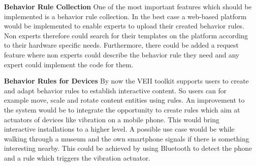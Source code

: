 \textbf{Behavior Rule Collection}
\newline
One of the most important features which should be implemented is a behavior rule collection. In the best case a web-based platform would be implemented to enable experts to upload their created behavior rules. Non experts therefore could search for their templates on the platform according to their hardware specific needs. Furthermore, there could be added a request feature where non experts could describe the behavior rule they need and any expert could implement the code for them.
\newline

\textbf{Behavior Rules for Devices}
\newline
By now the VEII toolkit supports users to create and adapt behavior rules to establish interactive content. So users can for example move, scale and rotate content entities using rules. An improvement to the system would be to integrate the opportunity to create rules which aim at actuators of devices like vibration on a mobile phone. This would bring interactive installations to a higher level. A possible use case would be while walking through a museum and the own smartphone signals if there is something interesting nearby. This could be achieved by using Bluetooth to detect the phone and a rule which triggers the vibration actuator.